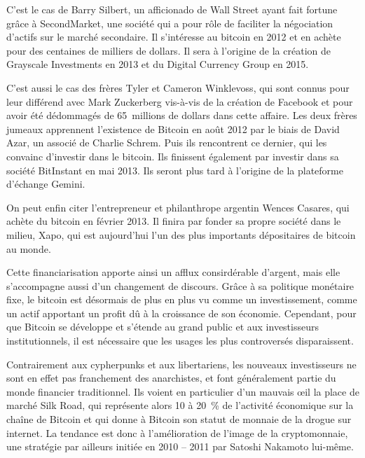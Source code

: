 C'est le cas de Barry Silbert, un afficionado de Wall Street ayant fait fortune grâce à SecondMarket, une société qui a pour rôle de faciliter la négociation d'actifs sur le marché secondaire. Il s'intéresse au bitcoin en 2012 et en achète pour des centaines de milliers de dollars. Il sera à l'origine de la création de Grayscale Investments en 2013 et du Digital Currency Group en 2015.

C'est aussi le cas des frères Tyler et Cameron Winklevoss, qui sont connus pour leur différend avec Mark Zuckerberg vis-à-vis de la création de Facebook et pour avoir été dédommagés de 65~millions de dollars dans cette affaire. Les deux frères jumeaux apprennent l'existence de Bitcoin en août 2012 par le biais de David Azar, un associé de Charlie Schrem. Puis ils rencontrent ce dernier, qui les convainc d'investir dans le bitcoin. Ils finissent également par investir dans sa société BitInstant en mai 2013. Ils seront plus tard à l'origine de la plateforme d'échange Gemini.

On peut enfin citer l'entrepreneur et philanthrope argentin Wences Casares, qui achète du bitcoin en février 2013. Il finira par fonder sa propre société dans le milieu, Xapo, qui est aujourd'hui l'un des plus importants dépositaires de bitcoin au monde.

Cette financiarisation apporte ainsi un afflux consirdérable d'argent, mais elle s'accompagne aussi d'un changement de discours. Grâce à sa politique monétaire fixe, le bitcoin est désormais de plus en plus vu comme un investissement, comme un actif apportant un profit dû à la croissance de son économie. Cependant, pour que Bitcoin se développe et s'étende au grand public et aux investisseurs institutionnels, il est nécessaire que les usages les plus controversés disparaissent.

Contrairement aux cypherpunks et aux libertariens, les nouveaux investisseurs ne sont en effet pas franchement des anarchistes, et font généralement partie du monde financier traditionnel. Ils voient en particulier d'un mauvais œil la place de marché Silk Road, qui représente alors 10 à 20~\% de l'activité économique sur la chaîne de Bitcoin et qui donne à Bitcoin son statut de monnaie de la drogue sur internet. La tendance est donc à l'amélioration de l'image de la cryptomonnaie, une stratégie par ailleurs initiée en 2010 -- 2011 par Satoshi Nakamoto lui-même.

